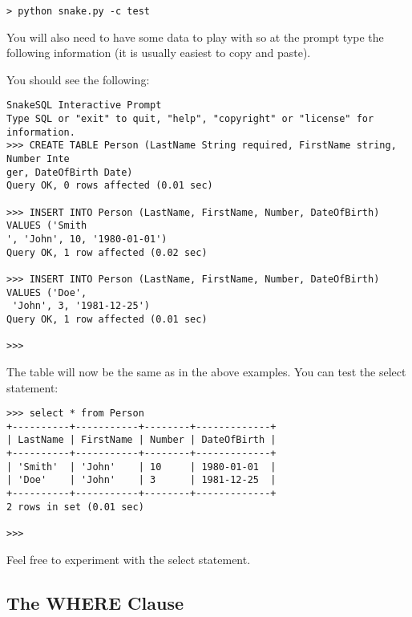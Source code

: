 \documentclass{howto}
\begin{document}
\begin{verbatim}
> python snake.py -c test
\end{verbatim}

You will also need to have some data to play with so at the prompt type the following information (it is usually easiest to copy and paste).


You should see the following:

\begin{verbatim}
SnakeSQL Interactive Prompt
Type SQL or "exit" to quit, "help", "copyright" or "license" for information.
>>> CREATE TABLE Person (LastName String required, FirstName string, Number Inte
ger, DateOfBirth Date)
Query OK, 0 rows affected (0.01 sec)

>>> INSERT INTO Person (LastName, FirstName, Number, DateOfBirth) VALUES ('Smith
', 'John', 10, '1980-01-01')
Query OK, 1 row affected (0.02 sec)

>>> INSERT INTO Person (LastName, FirstName, Number, DateOfBirth) VALUES ('Doe',
 'John', 3, '1981-12-25')
Query OK, 1 row affected (0.01 sec)

>>>
\end{verbatim}


The table will now be the same as in the above examples. You can test the select statement:

\begin{verbatim}
>>> select * from Person
+----------+-----------+--------+-------------+
| LastName | FirstName | Number | DateOfBirth |
+----------+-----------+--------+-------------+
| 'Smith'  | 'John'    | 10     | 1980-01-01  |
| 'Doe'    | 'John'    | 3      | 1981-12-25  |
+----------+-----------+--------+-------------+
2 rows in set (0.01 sec)

>>>
\end{verbatim}

Feel free to experiment with the select statement.

\subsection{The WHERE Clause}
\end{document}
